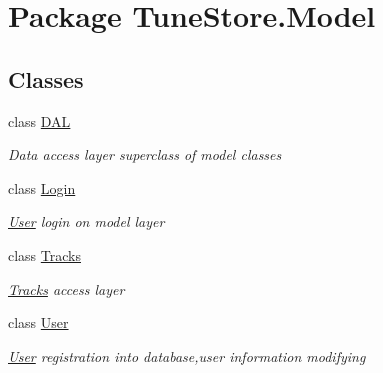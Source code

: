 \hypertarget{namespace_tune_store_1_1_model}{\section{Package Tune\+Store.\+Model}
\label{namespace_tune_store_1_1_model}
}
\subsection*{Classes}
\begin{DoxyCompactItemize}
\item 
class \hyperlink{class_tune_store_1_1_model_1_1_d_a_l}{D\+A\+L}
\begin{DoxyCompactList}\small\item\em Data access layer superclass of model classes \end{DoxyCompactList}\item 
class \hyperlink{class_tune_store_1_1_model_1_1_login}{Login}
\begin{DoxyCompactList}\small\item\em \hyperlink{class_tune_store_1_1_model_1_1_user}{User} login on model layer \end{DoxyCompactList}\item 
class \hyperlink{class_tune_store_1_1_model_1_1_tracks}{Tracks}
\begin{DoxyCompactList}\small\item\em \hyperlink{class_tune_store_1_1_model_1_1_tracks}{Tracks} access layer \end{DoxyCompactList}\item 
class \hyperlink{class_tune_store_1_1_model_1_1_user}{User}
\begin{DoxyCompactList}\small\item\em \hyperlink{class_tune_store_1_1_model_1_1_user}{User} registration into database,user information modifying \end{DoxyCompactList}\end{DoxyCompactItemize}
